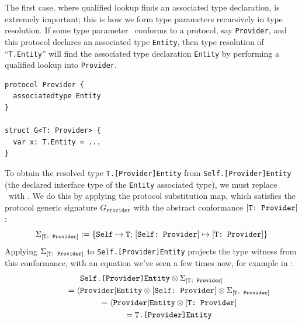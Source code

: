 \documentclass[../generics]{subfiles}
\begin{document}
The first case, where qualified lookup finds an associated type declaration, is extremely important; this is how we form type parameters recursively in type resolution. If some type parameter \tT\ conforms to a protocol, say \texttt{Provider}, and this protocol declares an associated type \texttt{Entity}, then type resolution of ``\texttt{T.Entity}'' will find the associated type declaration \texttt{Entity} by performing a qualified lookup into \texttt{Provider}.
\begin{Verbatim}
protocol Provider {
  associatedtype Entity
}

struct G<T: Provider> {
  var x: T.Entity = ...
}
\end{Verbatim}
To obtain the resolved type \texttt{T.[Provider]Entity} from \texttt{Self.[Provider]Entity} (the declared interface type of the \texttt{Entity} associated type), we must replace \tSelf\ with \tT. We do this by applying the protocol substitution map, which satisfies the protocol generic signature $G_\texttt{Provider}$ with the abstract conformance $[\texttt{T:~Provider}]$: \[\Sigma_{[\texttt{T:~Provider}]}:=\{\texttt{Self} \mapsto \texttt{T};\,[\texttt{Self:~Provider}] \mapsto [\texttt{T:~Provider}]\}\]
Applying $\Sigma_{[\texttt{T:~Provider}]}$ to \texttt{Self.[Provider]Entity} projects the type witness from this conformance, with an equation we've seen a few times now, for example in :
\begin{gather*}
\texttt{Self.[Provider]Entity}\otimes\Sigma_{[\texttt{T:~Provider}]}\\
\qquad\qquad{}=\langle\texttt{Provider}|\texttt{Entity}\otimes[\texttt{Self:~Provider}]\otimes\Sigma_{[\texttt{T:~Provider}]}\\
\qquad\qquad{}=\langle\texttt{Provider}|\texttt{Entity}\otimes[\texttt{T:~Provider}]\\
\qquad\qquad{}=\texttt{T.[Provider]Entity}
\end{gather*}
\end{document}
